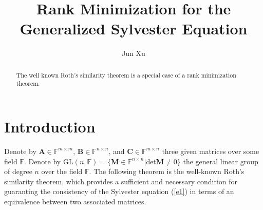 \documentclass{baustms}
\theoremstyle{cupthm}
\theoremstyle{cupdefn}
\theoremstyle{cuprem}
\numberwithin{equation}{section}
\begin{document}
\title{Rank Minimization for the Generalized Sylvester Equation}


\author[1]{Jun Xu}
\address[1]{Department of Computing, The Hong Kong Polytechnic University, Hung Hom, Hong Kong, China }




\begin{abstract}
The well known Roth's similarity theorem is a special case of a rank minimization theorem. 
\end{abstract}


\maketitle

\section{Introduction}
Denote by $\bm{A}\in\mathbb{F}^{m\times m}$, $\bm{B}\in\mathbb{F}^{n\times n}$, and $\bm{C}\in\mathbb{F}^{m\times n}$ three given matrices over some field $\mathbb{F}$. Denote by $\text{GL}(n,\mathbb{F})=\{\bm{M}\in\mathbb{F}^{n\times n}|\text{det}\bm{M}\neq0\}$ the general linear group of degree $n$ over the field $\mathbb{F}$. The following theorem is the well-known Roth's similarity theorem, which provides a sufficient and necessary condition for guaranting the consistency of the Sylvester equation (\ref{e1}) in terms of an equivalence between two associated matrices.
\end{document}
